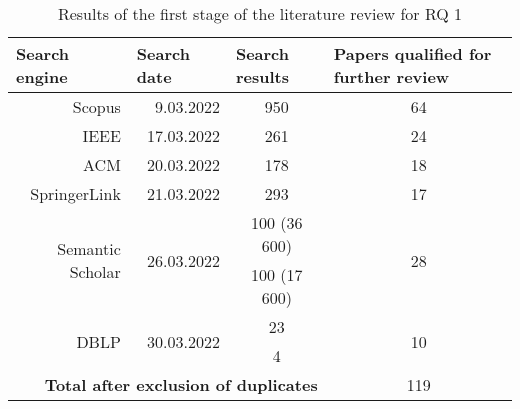 \begin{table}[]
    \centering
    \caption{Results of the first stage of the literature review for RQ 1}
    \begin{tabular}{@{}rrcc@{}}
        \toprule
        \multicolumn{1}{l}{\textbf{Search engine}} & \multicolumn{1}{l}{\textbf{Search date}} & \multicolumn{1}{l}{\textbf{Search results}} & \multicolumn{1}{l}{\textbf{Papers qualified for further review}} \\
        \midrule
        Scopus                                     & 9.03.2022                                & 950                                         & 64                                                               \\
        IEEE                                       & 17.03.2022                               & 261                                         & 24                                                               \\
        ACM                                        & 20.03.2022                               & 178                                         & 18                                                               \\
        SpringerLink                               & 21.03.2022                               & 293                                         & 17                                                               \\
        \multirow{2}{*}{Semantic Scholar}          & \multirow{2}{*}{26.03.2022}              & 100 (36 600)                                & \multirow{2}{*}{28}                                              \\
                                                   &                                          & 100 (17 600)                                &                                                                  \\
        \multirow{2}{*}{DBLP}                      & \multirow{2}{*}{30.03.2022}              & 23                                          & \multirow{2}{*}{10}                                              \\
                                                   &                                          & 4                                           &                                                                  \\
        \midrule
        \multicolumn{3}{r}{\textbf{Total after exclusion of duplicates}}                                                                    & 119                                                              \\
        \bottomrule
    \end{tabular}
    \label{tab:results-first-stage-review-rq-1}
\end{table}

